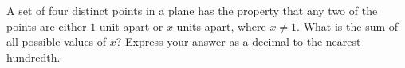 A set of four distinct points in a plane has the property that any two of the points are either $1$ unit apart or $x$ units apart, where $x\ne1$. What is the sum of all possible values of $x$? Express your answer as a decimal to the nearest hundredth.
